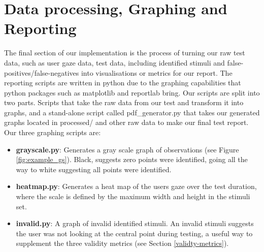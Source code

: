 \documentclass{l4proj}
\begin{document}
\section{Data processing, Graphing and Reporting}
The final section of our implementation is the process of turning our raw test data, such as user gaze data, test data, including identified stimuli and false-positives/false-negatives into visualisations or metrics for our report. The reporting scripts are written in python due to the graphing capabilities that python packages such as  matplotlib and reportlab bring. Our scripts are split into two parts. Scripts that take the raw data from our test and transform it into graphs, and a stand-alone script called pdf\_generator.py that takes our generated graphs located in processed/ and other raw data to make our final test report. 
\newpage
Our three graphing scripts are:
\begin{itemize}
    \item \textbf{grayscale.py}: Generates a  gray scale graph of observations (see Figure \ref{fig:example_gs}). Black, suggests zero points were identified, going all the way to white suggesting all points were identified.
    \item \textbf{heatmap.py}: Generates a heat map of the users gaze over the test duration, where the scale is defined by the maximum width and height in the stimuli set.
    \item \textbf{invalid.py}: A graph of invalid identified stimuli. An invalid stimuli suggests the user was not looking at the central point during testing, a useful way to supplement the three validity metrics (see Section \ref{validty-metrics}).
\end{itemize}
\end{document}
